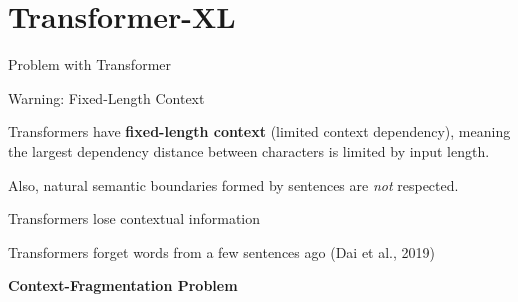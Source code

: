 

\section{Transformer-XL }


\begin{frame}{Problem with Transformer}
    
    \begin{alertBlock}{Warning: Fixed-Length Context}
        \large 
        
        Transformers have \textbf{\alert{fixed-length context}} (limited context dependency), meaning the largest dependency distance between characters is limited by input length. 
        
        Also, natural semantic boundaries formed by sentences are \textit{not} respected. 
        
        \begin{addmargin}{3em}{}
        \begin{itemizeSpaced}{2pt}
            \arrowitem Transformers lose contextual information 
            
            \arrowitem Transformers forget words from a few sentences ago (Dai et al., 2019)
            
            \arrowitem \textbf{Context-Fragmentation Problem}
        \end{itemizeSpaced}
        \end{addmargin} 
        
    \end{alertBlock}
    

\end{frame}
    
